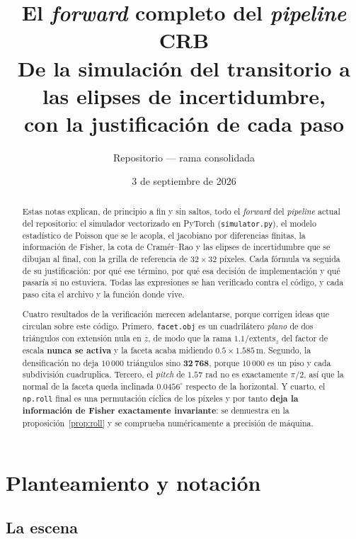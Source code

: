 \documentclass[11pt,a4paper]{article}
\title{\textbf{El \emph{forward} completo del \emph{pipeline} CRB}\\[2mm]
\large De la simulación del transitorio a las elipses de incertidumbre,\\
con la justificación de cada paso}
\author{Repositorio \code{crb} --- rama consolidada}
\date{3 de septiembre de 2026}
\newcommand{\code}[1]{\texttt{#1}}
\theoremstyle{definition}
\theoremstyle{plain}
\begin{document}
\maketitle

\begin{abstract}
Estas notas explican, de principio a fin y sin saltos, todo el \emph{forward} del
\emph{pipeline} actual del repositorio: el simulador vectorizado en PyTorch
(\code{simulator.py}), el modelo estadístico de Poisson que se le acopla, el
jacobiano por diferencias finitas, la información de Fisher, la cota de
Cramér--Rao y las elipses de incertidumbre que se dibujan al final, con la
grilla de referencia de $32\times32$ píxeles. Cada fórmula va seguida de su
justificación: por qué ese término, por qué esa decisión de implementación y qué
pasaría si no estuviera. Todas las expresiones se han verificado contra el
código, y cada paso cita el archivo y la función donde vive.

Cuatro resultados de la verificación merecen adelantarse, porque corrigen ideas
que circulan sobre este código. Primero, \code{facet.obj} es un cuadrilátero
\emph{plano} de dos triángulos con extensión nula en $z$, de modo que la rama
$1.1/\text{extents}_z$ del factor de escala \textbf{nunca se activa} y la faceta
acaba midiendo $0.5\times1.585\,$m. Segundo, la densificación no deja $10\,000$
triángulos sino $\mathbf{32\,768}$, porque $10\,000$ es un piso y cada
subdivisión cuadruplica. Tercero, el \emph{pitch} de $1.57$ rad no es
exactamente $\pi/2$, así que la normal de la faceta queda inclinada
$0.0456^\circ$ respecto de la horizontal. Y cuarto, el \code{np.roll} final es
una permutación cíclica de los píxeles y por tanto \textbf{deja la información
de Fisher exactamente invariante}: se demuestra en la
proposición~\ref{prop:roll} y se comprueba numéricamente a precisión de máquina.
\end{abstract}

\tableofcontents

\section{Planteamiento y notación}
\label{sec:planteamiento}

\subsection{La escena}
\end{document}

